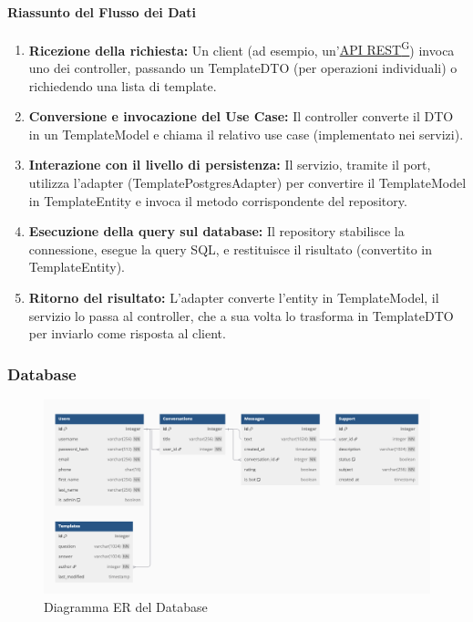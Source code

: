     \paragraph{Riassunto del Flusso dei Dati}
    \begin{enumerate}
        \item \textbf{Ricezione della richiesta:} Un client (ad esempio, un’\href{https://code7crusaders.github.io/docs/PB/documentazione_interna/glossario.html#api-rest-representational-state-transfer}{API REST\textsuperscript{G}}) invoca uno dei controller, passando un TemplateDTO (per operazioni individuali) o richiedendo una lista di template.
        \item \textbf{Conversione e invocazione del Use Case:} Il controller converte il DTO in un TemplateModel e chiama il relativo use case (implementato nei servizi).
        \item \textbf{Interazione con il livello di persistenza:} Il servizio, tramite il port, utilizza l’adapter (TemplatePostgresAdapter) per convertire il TemplateModel in TemplateEntity e invoca il metodo corrispondente del repository.
        \item \textbf{Esecuzione della query sul database:} Il repository stabilisce la connessione, esegue la query SQL, e restituisce il risultato (convertito in TemplateEntity).
        \item \textbf{Ritorno del risultato:} L’adapter converte l’entity in TemplateModel, il servizio lo passa al controller, che a sua volta lo trasforma in TemplateDTO per inviarlo come risposta al client.
    \end{enumerate}
    
    \subsubsection{Database}
    \begin{figure}[H]
        \centering
        \includegraphics[width=\linewidth, height=0.8\textheight, keepaspectratio]{./img/DB_ER.png}
        \caption{Diagramma ER del Database}
        \label{fig:db_er}
    \end{figure}

